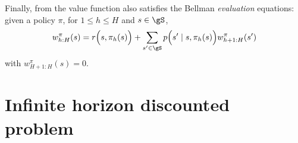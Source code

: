 

Finally, from \cite[Chapter~4]{puterman2014markov} the value function also satisfies the Bellman \emph{evaluation} equations: given a policy $\pi$, for $1\le h\le H$ and $s\in\gS$,
\begin{equation}
    \label{eq:finite_be_eval}
    w_{h:H}^\pi(s) = \displaystyle r\Big(s, \pi_h(s)\Big) +\sum_{s'\in\gS}p\Bigl(s' \mid s, \pi_h(s)\Bigr)w_{h+1:H}^\pi(s')
\end{equation}
with $w_{H+1:H}^\pi(s)=0$.
%

\section{Infinite horizon discounted problem}
\label{ch:mdp:sec:discounted}

